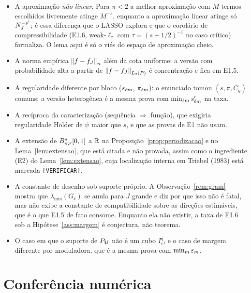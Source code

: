 \documentclass[11pt,a4paper]{article}
\begin{document}
\begin{itemize}[nosep]
  \item A aproximação \emph{não linear}. Para $\pi < 2$ a melhor aproximação
    com $M$ termos escolhidos livremente atinge $M^{-s}$, enquanto a
    aproximação linear atinge só $N_{J}^{-s'}$; é essa diferença que o LASSO
    explora e que o corolário de compressibilidade (E1.6, weak-$\ell_{\tau}$ com
    $\tau = (s + 1/2)^{-1}$ no caso crítico) formaliza. O lema aqui é só o
    viés do espaço de aproximação cheio.
  \item A norma empírica $\left\lVert f - f_{J} \right\rVert_{n}$ além da cota uniforme: a versão
    com probabilidade alta a partir de $\left\lVert f - f_{J} \right\rVert_{L_{2}(P)}$ é
    concentração e fica em E1.5.
  \item A regularidade diferente por bloco ($s_{\ell m}$, $\pi_{\ell m}$): o
    enunciado tomou $(s, \pi, C_{g})$ comuns; a versão heterogênea é a mesma
    prova com $\min_{\ell m}s'_{\ell m}$ na taxa.
  \item A recíproca da caracterização (sequência $\Rightarrow$ função), que
    exigiria regularidade Hölder de $\psi$ maior que $s$, e que as provas de
    E1 não usam.
  \item A extensão de $B^{s}_{\pi,r}[0,1]$ a $\mathbb{R}$ na
    Proposição~\ref{prop:periodizacao} e no Lema~\ref{lem:extensao}, que
    está citada e não provada, assim como o ingrediente (E2) do
    Lema~\ref{lem:extensao}, cuja localização interna em Triebel (1983)
    está marcada \texttt{[VERIFICAR]}.
  \item A constante de desenho sob suporte próprio. A
    Observação~\ref{rem:gram} mostra que $\lambda_{\min}(G_{\varepsilon})$
    se anula para $J$ grande e diz por que isso não é fatal, mas não exibe a
    constante de compatibilidade sobre as direções estimáveis, que é o que
    E1.5 de fato consome. Enquanto ela não existir, a taxa de E1.6 sob a
    Hipótese~\ref{ass:margem} é conjectura, não teorema.
  \item O caso em que o suporte de $P_{\mathbf{U}}$ não é um cubo
    $I_{\varepsilon}^{q}$, e o caso de margem diferente por moduladora, que
    é a mesma prova com $\min_{m}\varepsilon_{m}$.
\end{itemize}

\section{Conferência numérica}
\end{document}

